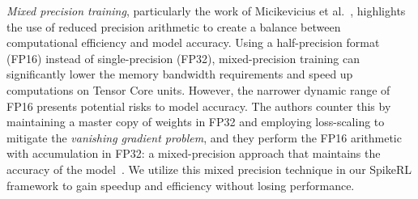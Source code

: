 \emph{Mixed precision training}, particularly the work of Micikevicius et
al.~\cite{b20}, highlights the use of reduced precision arithmetic to
create a balance between computational efficiency and model accuracy.
Using a half-precision format (FP16) instead of single-precision (FP32),
mixed-precision training can significantly lower the memory bandwidth
requirements and speed up computations on Tensor Core units. However,
the narrower dynamic range of FP16 presents potential risks to model
accuracy. The authors counter this by maintaining a master copy of
weights in FP32 and employing loss-scaling to mitigate the
\emph{vanishing gradient problem}, and they perform the FP16 arithmetic
with accumulation in FP32: a mixed-precision approach that maintains the
accuracy of the model~\cite{b35}. We utilize this mixed precision technique in our SpikeRL framework to gain speedup and efficiency without losing performance.

\iffalse
With the knowledge of mixed precision training, distributed training,
and combined architecture of SNN and DeepRL, we move forward to develop our
scalable and efficient SpikeRL infrastructure.
\fi